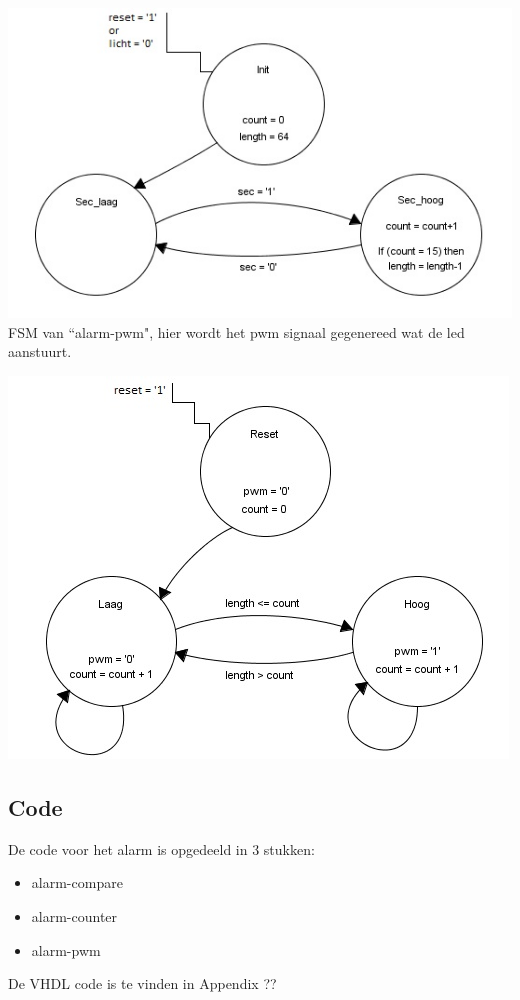 \includegraphics[width=\textwidth,height=\textheight,keepaspectratio]{FSM/alarm-count-fsm.jpg}
\newpage
FSM van ``alarm-pwm", hier wordt het pwm signaal gegenereed wat de led aanstuurt.

\includegraphics[width=\textwidth,height=\textheight,keepaspectratio]{FSM/alarm-pwm-fsm.jpg}
\subsection{Code}
De code voor het alarm is opgedeeld in 3 stukken:
\begin{itemize}[nolistsep]
\item alarm-compare
\item alarm-counter
\item alarm-pwm
\end{itemize}
De VHDL code is te vinden in Appendix ??
